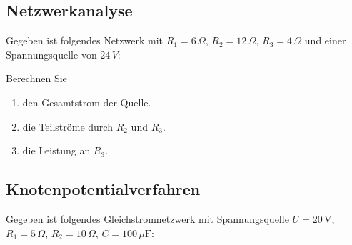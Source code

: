 \documentclass[a4paper,12pt]{article}
\newif\ifshowsolutions
\begin{document}
\subsection{Netzwerkanalyse}

Gegeben ist folgendes Netzwerk mit $R_1 = 6\,\Omega$, $R_2 = 12\,\Omega$, $R_3 = 4\,\Omega$ und einer Spannungsquelle von $24\,V$:

\begin{center}
\end{center}

Berechnen Sie

\begin{enumerate}
  \item den Gesamtstrom der Quelle.
  \item die Teilströme durch $R_2$ und $R_3$.
  \item die Leistung an $R_3$.
\end{enumerate}

\ifshowsolutions
Lösung:
\[
R_{23} = \frac{12 \cdot 4}{16} = 3\,\Omega
\]
\[
R = 6 + 3 = 9\,\Omega
\]
\[
I = \frac{24}{9} = 2.67\,\text{A}
\]
\[
U_{23} = I \cdot 3 = 8\,\text{V}
\]
\[
I_2 = \frac{8}{12} = 0.67\,\text{A}, \quad I_3 = \frac{8}{4} = 2\,\text{A}
\]
\[
P_3 = I_3^2 R_3 = 16\,\text{W}
\]
\fi

\subsection{Knotenpotentialverfahren}

Gegeben ist folgendes Gleichstromnetzwerk mit Spannungsquelle $U = 20\,\mathrm{V}$, $R_1 = 5\,\Omega$, $R_2 = 10\,\Omega$, $C = 100\,\mu\mathrm{F}$:

\begin{center}
\end{center}
\end{document}
